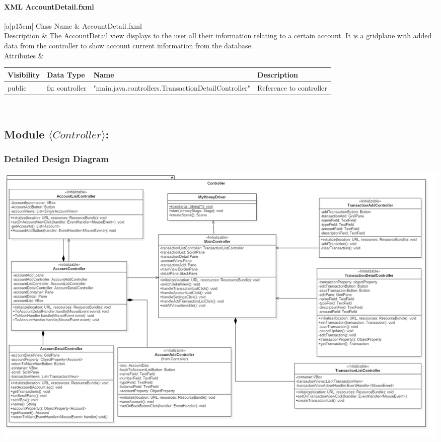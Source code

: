 \documentclass[12pt]{article}
\begin{document}
\paragraph{XML AccountDetail.fxml}

\begin{table}[H]
	\begin{tabular}{|a|p{15cm}|}
		\hline
		{Class Name} & {AccountDetail.fxml} \\
		\hline
		Description & The AccountDetail view displays to the user all their information relating to a certain account. It is a gridplane with added data from the controller to show account current information from the database.\\
		\hline
		Attributes & 
		\begin{tabular}{| p{2cm} | p{3.5cm} | p{1.5cm} | p{6.45cm} |}
			\hline
			\rowcolor{lightgray}
			Visibility & Data Type & Name & Description \\	\hline
			\rowcolor{white}
			public & fx: controller & "main.java.controllers.TransactionDetailController" & Reference to controller\\
		\end{tabular} \\
		\hline							 
	\end{tabular}
\end{table}



\subsection{Module $\langle Controller\rangle$:}

\subsubsection{Detailed Design Diagram}

\includegraphics[width=\graphicwidth]{images/Controller.png}
\end{document}
